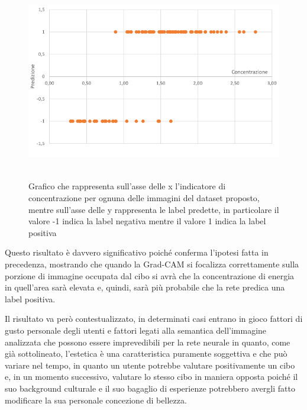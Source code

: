 \begin{figure}[H]
\centering
\includegraphics[height=87mm]{images/graficoRappPred.png}
\caption{Grafico che rappresenta sull'asse delle x l'indicatore di concentrazione per ognuna delle immagini del dataset proposto, mentre sull'asse delle y rappresenta le label predette, in particolare il valore -1 indica la label negativa mentre il valore 1 indica la label positiva}
\label{graficoRappPred}
\end{figure}

Questo risultato è davvero significativo poiché conferma l'ipotesi fatta in precedenza, mostrando che quando la Grad-CAM si focalizza correttamente sulla porzione di immagine occupata dal cibo si avrà che la concentrazione di energia in quell'area sarà elevata e, quindi, sarà più probabile che la rete predica una label positiva.

Il risultato va però contestualizzato, in determinati casi entrano in gioco fattori di gusto personale degli utenti e fattori legati alla semantica dell'immagine analizzata che possono essere imprevedibili per la rete neurale in quanto, come già sottolineato, l'estetica è una caratteristica puramente soggettiva e che può variare nel tempo, in quanto un utente potrebbe valutare positivamente un cibo e, in un momento successivo, valutare lo stesso cibo in maniera opposta poiché il suo background culturale e il suo bagaglio di esperienze potrebbero avergli fatto modificare la sua personale concezione di bellezza.





